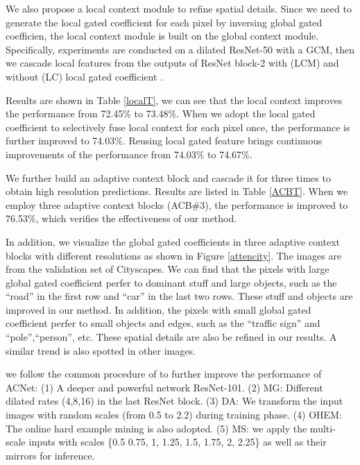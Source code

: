 \documentclass[10pt,twocolumn,letterpaper]{article}
\begin{document}
\begin{table*}[tp]
\vspace{-1.2em}
\label{cityset}
\end{table*}


 We also propose  a local context module to refine spatial details. Since we need to generate the local gated coefficient for each pixel by inversing global gated coefficien, the local context module is built on the global context module.
Specifically, experiments are conducted on a dilated ResNet-50 with a GCM, then we  cascade local features from the outputs of ResNet block-2 with (LCM) and without (LC) local gated coefficient .

Results are shown in Table \ref{localT},  we can see that the local context improves the performance from 72.45\% to 73.48\%. When we adopt the  local gated coefficient to selectively fuse local context for each pixel once, the  performance is further improved to 74.03\%.
Reusing local gated feature brings  continuous improvements of the performance from 74.03\% to 74.67\%.

  We further build an  adaptive context block and cascade it for three times to  obtain  high resolution predictions.  Results are listed in Table \ref{ACBT}. When we employ three  adaptive context blocks (ACB\#3), the performance is improved to 76.53\%, which verifies the effectiveness of our method. 

In addition, we visualize the  global gated coefficients in three  adaptive context blocks with different resolutions as shown in Figure \ref{attencity}. The images are from the validation set of Cityscapes.  We can find that the pixels with large  global gated coefficient perfer to dominant stuff and large objects,  such as the ``road'' in the first row and ``car'' in the last two rows.  These stuff and objects are improved in our method. In addition, the pixels with small  global gated coefficient perfer to small objects and edges, such as the ``traffic sign'' and ``pole'',``person'', etc. These spatial details are also be refined in our results.  A similar trend is also spotted in other images.

 we follow the common procedure of \cite{deeplabv3,  fu2018dual,he2019adaptive,ding2019semantic,ding2019boundary,he2019dynamic} to further  improve the performance of ACNet: (1) A deeper and powerful network ResNet-101. (2) MG: Different dilated rates (4,8,16) in the last ResNet block.    (3) DA: We transform the input images with random scales (from 0.5 to 2.2) during training phase. (4) OHEM: The online hard example mining is also adopted. (5) MS:  we apply the multi-scale inputs with scales \{0.5 0.75, 1, 1.25, 1.5, 1.75, 2, 2.25\} as well as their mirrors for inference. 
\end{document}
